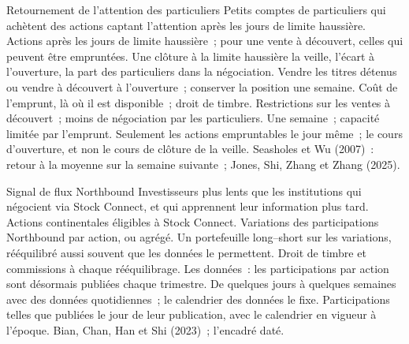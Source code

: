 \begin{strategyfile}{Retournement de l'attention des particuliers}\label{strat:s1:asia-specific-equity-strategies:retail}
 Petits comptes de particuliers qui achètent des actions captant l'attention après les jours de limite haussière.
 Actions après les jours de limite haussière~; pour une vente à découvert, celles qui peuvent être empruntées.
 Une clôture à la limite haussière la veille, l'écart à l'ouverture, la part des particuliers dans la négociation.
 Vendre les titres détenus ou vendre à découvert à l'ouverture~; conserver la position une semaine.
 Coût de l'emprunt, là où il est disponible~; droit de timbre.
 Restrictions sur les ventes à découvert~; moins de négociation par les particuliers.
 Une semaine~; capacité limitée par l'emprunt.
 Seulement les actions empruntables le jour même~; le cours d'ouverture, et non le cours de clôture de la veille.
 Seasholes et Wu (2007)~: retour à la moyenne sur la semaine suivante~; Jones, Shi, Zhang et Zhang (2025).
\end{strategyfile}

\begin{strategyfile}{Signal de flux Northbound}\label{strat:s1:asia-specific-equity-strategies:northbound}
 Investisseurs plus lents que les institutions qui négocient via Stock Connect, et qui apprennent leur information plus tard.
 Actions continentales éligibles à Stock Connect.
 Variations des participations Northbound par action, ou  agrégé.
 Un portefeuille long--short sur les variations, rééquilibré aussi souvent que les données le permettent.
 Droit de timbre et commissions à chaque rééquilibrage.
 Les données~: les participations par action sont désormais publiées chaque trimestre.
 De quelques jours à quelques semaines avec des données quotidiennes~; le calendrier des données le fixe.
 Participations telles que publiées le jour de leur publication, avec le calendrier en vigueur à l'époque.
 Bian, Chan, Han et Shi (2023)~; l'encadré daté.
\end{strategyfile}

